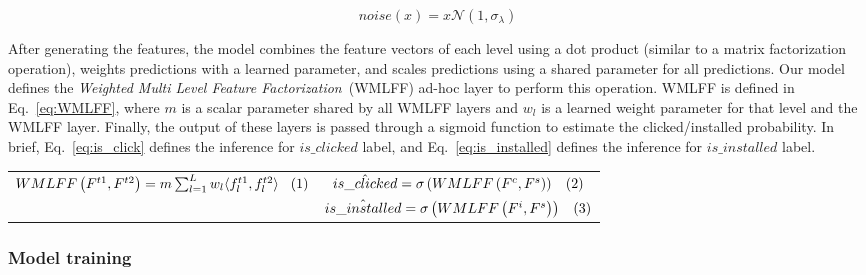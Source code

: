 \documentclass[manuscript,nonacm]{acmart}
\begin{document}
\begin{equation}\label{eq:noise}
    noise\left(x\right) = x\mathcal{N}\left(1,\sigma_\lambda\right) \end{equation}

After generating the features, the model combines the feature vectors of each level using a dot product (similar to a matrix factorization operation), weights predictions with a learned parameter, and scales predictions using a shared parameter for all predictions. Our model defines the \textit{Weighted Multi Level Feature Factorization}~(WMLFF) ad-hoc layer to perform this operation. WMLFF is defined in Eq.~\ref{eq:WMLFF}, where $m$ is a scalar parameter shared by all WMLFF layers and $w_l$ is a learned weight parameter for that level and the WMLFF layer. Finally, the output of these layers is passed through a sigmoid function to estimate the clicked/installed probability. In brief, Eq.~\ref{eq:is_click} defines the inference for $is\_clicked$ label, and Eq.~\ref{eq:is_installed} defines the inference for $is\_installed$ label.\vspace{-0.3cm}




\begin{table}[H]
    \centering
   
\begin{tabular}{cc}

\multirow{2}{0.5\columnwidth}{ $WMLFF\left( F^{t1}, F^{t2} \right) = m \sum_{l=1}^{L} w_l \langle f^{t1}_l,f^{t2}_l \rangle \hspace{0.3cm}\refstepcounter{equation}(\theequation)\label{eq:WMLFF}$  } 

& $  \hat{is\_clicked} = \sigma\left( WMLFF\left( F^{c}, F^{s} \right)\right)\hspace{0.3cm}\refstepcounter{equation}(\theequation)\label{eq:is_click}$ \tabularnewline
& $   \hat{is\_installed} = \sigma\left( WMLFF\left( F^{i}, F^{s} \right)\right)
\hspace{0.3cm}\refstepcounter{equation}(\theequation)\label{eq:is_installed}$

    \end{tabular}\vspace{-0.5cm}
   
\end{table}

\subsubsection*{\textbf{Model training}}\hfill 
\end{document}
